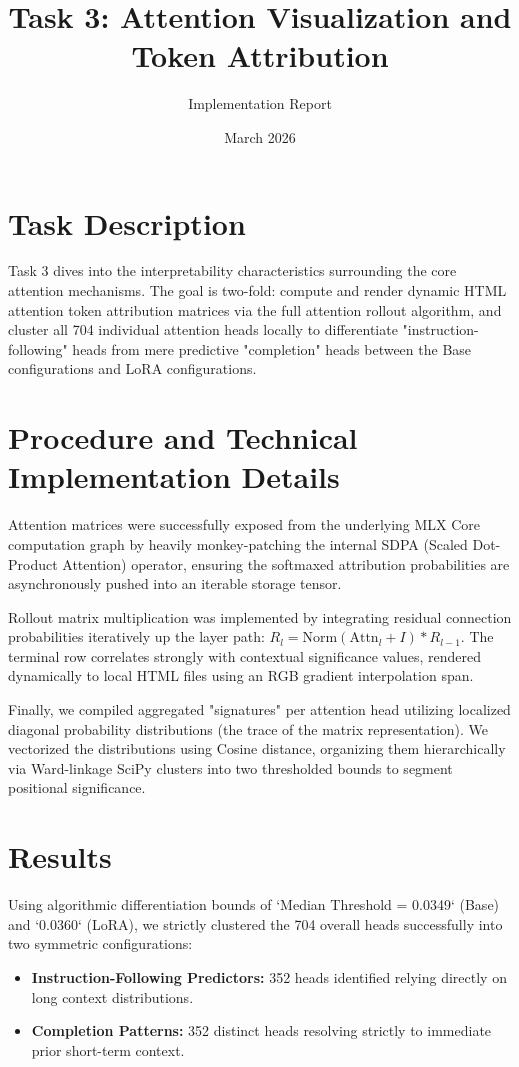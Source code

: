 \documentclass{article}
\title{Task 3: Attention Visualization and Token Attribution}
\author{Implementation Report}
\date{March 2026}
\begin{document}
\maketitle

\section{Task Description}
Task 3 dives into the interpretability characteristics surrounding the core attention mechanisms. The goal is two-fold: compute and render dynamic HTML attention token attribution matrices via the full attention rollout algorithm, and cluster all 704 individual attention heads locally to differentiate "instruction-following" heads from mere predictive "completion" heads between the Base configurations and LoRA configurations.

\section{Procedure and Technical Implementation Details}
Attention matrices were successfully exposed from the underlying MLX Core computation graph by heavily monkey-patching the internal SDPA (Scaled Dot-Product Attention) operator, ensuring the softmaxed attribution probabilities are asynchronously pushed into an iterable storage tensor. 

Rollout matrix multiplication was implemented by integrating residual connection probabilities iteratively up the layer path: $R_{l} = \text{Norm}(\text{Attn}_l + I) * R_{l-1}$. The terminal row correlates strongly with contextual significance values, rendered dynamically to local HTML files using an RGB gradient interpolation span.

Finally, we compiled aggregated "signatures" per attention head utilizing localized diagonal probability distributions (the trace of the matrix representation). We vectorized the distributions using Cosine distance, organizing them hierarchically via Ward-linkage SciPy clusters into two thresholded bounds to segment positional significance.

\section{Results}
Using algorithmic differentiation bounds of `Median Threshold = 0.0349` (Base) and `0.0360` (LoRA), we strictly clustered the 704 overall heads successfully into two symmetric configurations:

\begin{itemize}
    \item \textbf{Instruction-Following Predictors:} 352 heads identified relying directly on long context distributions.
    \item \textbf{Completion Patterns:} 352 distinct heads resolving strictly to immediate prior short-term context.
\end{itemize}
\end{document}
